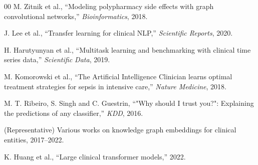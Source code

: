 \documentclass[conference,onecolumn]{IEEEtran}
\begin{document}
\begin{thebibliography}{00}
 M. Zitnik et al., ``Modeling polypharmacy side effects with graph convolutional networks,'' \textit{Bioinformatics}, 2018.

 J. Lee et al., ``Transfer learning for clinical NLP,'' \textit{Scientific Reports}, 2020.

 H. Harutyunyan et al., ``Multitask learning and benchmarking with clinical time series data,'' \textit{Scientific Data}, 2019.

 M. Komorowski et al., ``The Artificial Intelligence Clinician learns optimal treatment strategies for sepsis in intensive care,'' \textit{Nature Medicine}, 2018.

 M. T. Ribeiro, S. Singh and C. Guestrin, ``"Why should I trust you?": Explaining the predictions of any classifier,'' \textit{KDD}, 2016.

 (Representative) Various works on knowledge graph embeddings for clinical entities, 2017--2022.

 K. Huang et al., ``Large clinical transformer models,'' 2022.

\end{thebibliography}
\end{document}
